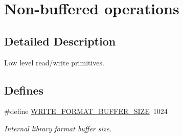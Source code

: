 \hypertarget{group__stream__low}{
\section{Non-buffered operations}
\label{group__stream__low}
}


\subsection{Detailed Description}
Low level read/write primitives. 



\subsection*{Defines}
\begin{CompactItemize}
\item 
\#define \hyperlink{group__stream__low_ga6}{WRITE\_\-FORMAT\_\-BUFFER\_\-SIZE}\ 1024
\begin{CompactList}\small\item\em Internal library format buffer size. \item\end{CompactList}\end{CompactItemize}
